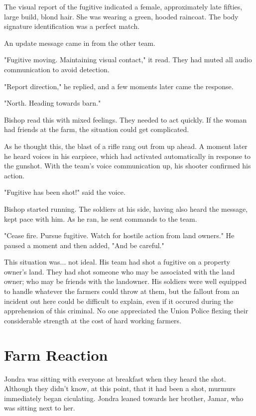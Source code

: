\documentclass[courier]{sffms}
\begin{document}
The visual report of the fugitive indicated a female,
approximately late fifties, large build, blond hair. She
was wearing a green, hooded raincoat. The body
signature identification was a perfect match.

An update message came in from the other team.

"Fugitive moving. Maintaining visual contact,"
it read. They
had muted all audio communication to avoid
detection.

"Report direction," he replied, and a few moments later
came the response.

"North. Heading towards barn."

Bishop read this with mixed feelings. They needed to
act quickly. If the woman had friends at the farm, the
situation could get complicated.

As he thought this, the blast of a rifle rang out from up
ahead. A moment later he heard voices in his earpiece,
which had activated automatically in response to the 
gunshot. With the team's voice communication up, his
shooter confirmed his action.

"Fugitive has been shot!" said the voice.

Bishop started running. The soldiers at his side, having
also heard the message, kept pace with him. As he ran,
he sent commands to the team.

"Cease fire. Pursue fugitive. Watch for hostile action
from land owners." He paused a moment and then 
added, "And be careful."

This situation was... not ideal. His team had shot a fugitive
on a property owner's land. They had shot someone who
may be associated with the land owner; who may be 
friends with the landowner. His soldiers were well
equipped to handle whatever the farmers could throw 
at them, but the fallout from an incident out here could be
difficult to explain, even if it occured during the
apprehension of this criminal.
No one appreciated the Union Police flexing their 
considerable strength at the cost of hard working
farmers.

\chapter{Farm Reaction}
Jondra was sitting with 
everyone at breakfast when they heard the shot.
Although they didn't know, at this point, that
it had been a shot, murmurs immediately began ciculating.
Jondra leaned towards her brother, Jamar, who was
sitting next to her.
\end{document}
